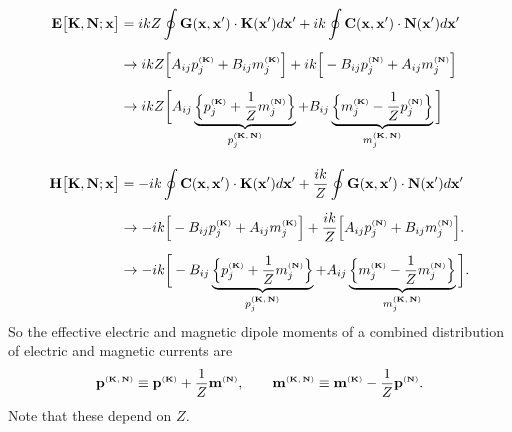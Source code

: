 \documentclass[letterpaper]{article}
\begin{document}
\begin{align*}
 \mathbf{E}\big[\mathbf{K}, \mathbf{N}; \mathbf{x}\big]
 &=  ikZ \oint \mathbf{G}(\mathbf{x}, \mathbf{x}^\prime) \cdot \mathbf{K}(\mathbf{x}^\prime) d\mathbf{x}^\prime
     + ik\oint \mathbf{C}(\mathbf{x}, \mathbf{x}^\prime) \cdot \mathbf{N}(\mathbf{x}^\prime) d\mathbf{x}^\prime
\\[5pt]
 &\to ikZ \Big[   A_{ij} p_j^{\text{\tiny{($\mathbf{K}$)}}} + B_{ij} m_j^{\text{\tiny{($\mathbf{K}$)}}} \Big] 
       +ik\Big[  -B_{ij} p_j^{\text{\tiny{($\mathbf{N}$)}}} + A_{ij} m_j^{\text{\tiny{($\mathbf{N}$)}}} \Big]
\\[5pt]
 &\to ikZ \bigg[   A_{ij} 
                  \underbrace{\Big\{ p_j^{\text{\tiny{($\mathbf{K}$)}}} + \frac{1}{Z}m_j^{\text{\tiny{($\mathbf{N}$)}}} \Big\}}
                             _{p_j^{\text{\tiny{($\mathbf{K,N}$)}}}}
                  +B_{ij} 
                  \underbrace{\Big\{ m_j^{\text{\tiny{($\mathbf{K}$)}}} - \frac{1}{Z}p_j^{\text{\tiny{($\mathbf{N}$)}}} \Big\}}
                             _{m_j^{\text{\tiny{($\mathbf{K,N}$)}}}}
          \bigg]
\\[10pt]
 \mathbf{H}\big[\mathbf{K}, \mathbf{N}; \mathbf{x}\big]
 &=  -ik\oint \mathbf{C}(\mathbf{x}, \mathbf{x}^\prime) \cdot \mathbf{K}(\mathbf{x}^\prime) d\mathbf{x}^\prime
   +\frac{ik}{Z} \oint \mathbf{G}(\mathbf{x}, \mathbf{x}^\prime) \cdot \mathbf{N}(\mathbf{x}^\prime) d\mathbf{x}^\prime
\\[5pt]
 &\to       -ik\Big[  -B_{ij} p_j^{\text{\tiny{($\mathbf{K}$)}}} + A_{ij} m_j^{\text{\tiny{($\mathbf{K}$)}}} \Big]
  +\frac{ik}{Z}\Big[   A_{ij} p_j^{\text{\tiny{($\mathbf{N}$)}}} + B_{ij} m_j^{\text{\tiny{($\mathbf{N}$)}}} \Big].
\\[5pt]
 &\to      -ik\bigg[  -B_{ij} 
                      \underbrace{\Big\{p_j^{\text{\tiny{($\mathbf{K}$)}}} + \frac{1}{Z}m_j^{\text{\tiny{($\mathbf{N}$)}}}\Big\}}
                                _{p_j^{\text{\tiny{($\mathbf{K,N}$)}}}}
                      +A_{ij} 
                      \underbrace{\Big\{m_j^{\text{\tiny{($\mathbf{K}$)}}} - \frac{1}{Z}m_j^{\text{\tiny{($\mathbf{N}$)}}}\Big\}}
                                _{m_j^{\text{\tiny{($\mathbf{K,N}$)}}}}
              \bigg].
\end{align*}
So the effective electric and magnetic dipole moments of a combined
distribution of electric and magnetic currents are 
$$ \mathbf{p}^{\text{\tiny{($\mathbf{K,N}$)}}} \equiv \mathbf{p}^{\text{\tiny{($\mathbf{K}$)}}} + \frac{1}{Z}\mathbf{m}^{\text{\tiny{($\mathbf{N}$)}}},
   \qquad
   \mathbf{m}^{\text{\tiny{($\mathbf{K,N}$)}}} \equiv \mathbf{m}^{\text{\tiny{($\mathbf{K}$)}}} - \frac{1}{Z}\mathbf{p}^{\text{\tiny{($\mathbf{N}$)}}}.
$$
Note that these depend on $Z$.

\newcommand{\MMExt}{\check{\mathcal{M}}}
\newcommand{\MMInt}{\hat{\mathcal{M}}}
\newcommand{\NNExt}{\check{\mathcal{N}}}
\newcommand{\NNInt}{\hat{\mathcal{N}}}
\newcommand{\BMMExt}{\boldsymbol{\check{\mathcal{M}}}}
\newcommand{\BMMInt}{\boldsymbol{\hat{\mathcal{M}}}}
\newcommand{\BNNExt}{\boldsymbol{\check{\mathcal{N}}}}
\newcommand{\BNNInt}{\boldsymbol{\hat{\mathcal{N}}}}
\newpage
\end{document}
